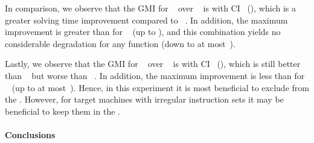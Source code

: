 In comparison, we observe that the \gls{GMI} for ~ over ~ is \printGMI{%
  \SolvTechDisableBadPresolvingPrePlusSolvingTimeSpeedupPrePlusSolvingTimeRegularSpeedupGmean%
} with \gls{CI}~\printGMICI{%
  \SolvTechDisableBadPresolvingPrePlusSolvingTimeSpeedupPrePlusSolvingTimeRegularSpeedupCiMin%
}{%
  \SolvTechDisableBadPresolvingPrePlusSolvingTimeSpeedupPrePlusSolvingTimeRegularSpeedupCiMax%
} (), which is a greater solving
time improvement compared to ~.
%
In addition, the maximum improvement is greater than for ~ (up to
\printZCNorm{%
  \SolvTechDisableBadPresolvingPrePlusSolvingTimeSpeedupPrePlusSolvingTimeZeroCenteredSpeedupMax%
}), and this combination yields no considerable degradation for any
\gls{function} (down to at
most~\printZCNorm{%
  \SolvTechDisableBadPresolvingPrePlusSolvingTimeSpeedupPrePlusSolvingTimeZeroCenteredSpeedupMin%
}).

Lastly, we observe that the \gls{GMI} for ~ over ~ is \printGMI{%
  \SolvTechDisableAllPresolvingPrePlusSolvingTimeSpeedupPrePlusSolvingTimeRegularSpeedupGmean%
} with \gls{CI}~\printGMICI{%
  \SolvTechDisableAllPresolvingPrePlusSolvingTimeSpeedupPrePlusSolvingTimeRegularSpeedupCiMin%
}{%
  \SolvTechDisableAllPresolvingPrePlusSolvingTimeSpeedupPrePlusSolvingTimeRegularSpeedupCiMax%
} (), which is still better than
~ but worse than
~.
%
In addition, the maximum improvement is less than for ~ (up to at
most~\printZCNorm{%
  \SolvTechDisableAllPresolvingPrePlusSolvingTimeSpeedupPrePlusSolvingTimeZeroCenteredSpeedupMax%
}).
%
Hence, in this experiment it is most beneficial to exclude
 from the
.
%
However, for \glspl{target machine} with irregular \glspl{instruction set} it
may be beneficial to keep them in the .


\paragraph{Conclusions}

